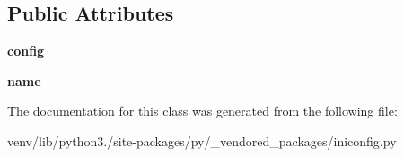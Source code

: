 \subsection*{Public Attributes}
\begin{DoxyCompactItemize}
\item 
\mbox{\label{classpy_1_1__vendored__packages_1_1iniconfig_1_1_section_wrapper_aa903a4611431b4d2e2f5c40cba498461}} 
{\bfseries config}
\item 
\mbox{\label{classpy_1_1__vendored__packages_1_1iniconfig_1_1_section_wrapper_a57701812996e4dc581a6673de9d7f454}} 
{\bfseries name}
\end{DoxyCompactItemize}


The documentation for this class was generated from the following file\+:\begin{DoxyCompactItemize}
\item 
venv/lib/python3./site-\/packages/py/\+\_\+vendored\+\_\+packages/iniconfig.\+py\end{DoxyCompactItemize}
